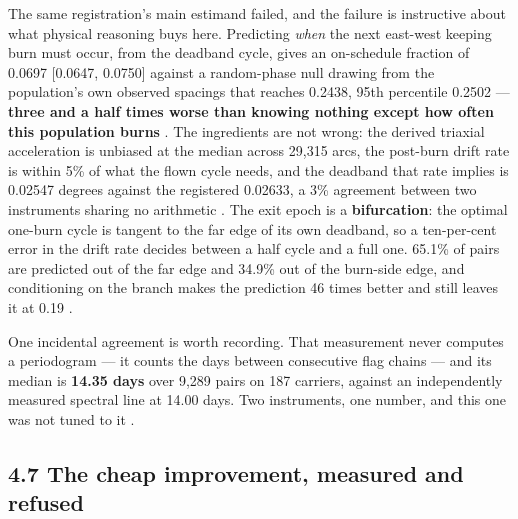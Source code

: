 \documentclass[11pt]{article}
\begin{document}
The same registration's main estimand failed, and the failure is instructive about what physical reasoning buys here. Predicting \emph{when} the next east-west keeping burn must occur, from the deadband cycle, gives an on-schedule fraction of 0.0697 [0.0647, 0.0750] against a random-phase null drawing from the population's own observed spacings that reaches 0.2438, 95th percentile 0.2502 --- \textbf{three and a half times worse than knowing nothing except how often this population burns}%
. The ingredients are not wrong: the derived triaxial acceleration is unbiased at the median across 29,315 arcs, the post-burn drift rate is within 5\% of what the flown cycle needs, and the deadband that rate implies is 0.02547 degrees against the registered 0.02633, a 3\% agreement between two instruments sharing no arithmetic%
. The exit epoch is a \textbf{bifurcation}: the optimal one-burn cycle is tangent to the far edge of its own deadband, so a ten-per-cent error in the drift rate decides between a half cycle and a full one. 65.1\% of pairs are predicted out of the far edge and 34.9\% out of the burn-side edge, and conditioning on the branch makes the prediction 46 times better and still leaves it at 0.19%
.

One incidental agreement is worth recording. That measurement never computes a periodogram --- it counts the days between consecutive flag chains --- and its median is \textbf{14.35 days} over 9,289 pairs on 187 carriers, against an independently measured spectral line at 14.00 days. Two instruments, one number, and this one was not tuned to it%
.

\subsection*{4.7 The cheap improvement, measured and refused}
\end{document}
